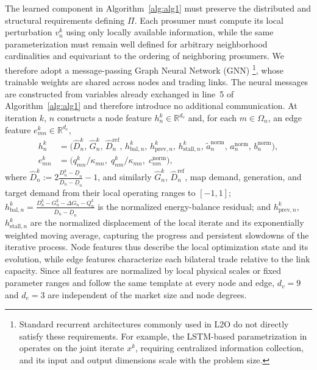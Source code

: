 \documentclass[final]{l4dc2026}
\begin{document}
The learned component in Algorithm~\ref{alg:alg1} must preserve the distributed and structural requirements defining $\Pi$. Each prosumer must compute its local perturbation $v_n^k$ using only locally available information, while the same parameterization must remain well defined for arbitrary neighborhood cardinalities and equivariant to the ordering of neighboring prosumers.
We therefore adopt a message-passing Graph Neural Network (GNN)
\footnote{Standard recurrent architectures commonly used in L2O do not directly satisfy these requirements. For example, the LSTM-based parametrization in~\citep{martin_learning_2026} operates on the joint iterate $x^k$, requiring centralized information collection, and its input and output dimensions scale with the problem size.}\citep{qian2024exploring}, whose trainable weights are shared across nodes and trading links.
The neural messages are constructed from variables already exchanged in line~5 of Algorithm~\ref{alg:alg1} and therefore introduce no additional communication.
At iteration $k$, $n$ constructs a node feature $h_n^k\in\mathbb{R}^{d_v}$ and, for each $m\in\Omega_n$, an edge feature $e_{mn}^k\in\mathbb{R}^{d_e}$,
\begin{equation}
\begin{aligned}
  h_n^k &= \big(\hat D_n^k,\, \hat G_n^k,\, \hat D_n^{\text{ref}},\,
  h_{\mathrm{bal},n}^k,\, h_{\mathrm{prev},n}^k,\, h_{\mathrm{stall},n}^k,\,
  \tilde a_n^{\text{norm}},\, a_n^{\text{norm}},\, b_n^{\text{norm}}\big),\\
  e_{mn}^k &= \big(q_{mn}^k/\kappa_{mn},\; q_{nm}^k/\kappa_{mn},\; c_{nm}^{\text{norm}}\big),
\end{aligned}
\label{eq:features}
\end{equation}
where $\hat D_n^k := 2\frac{D_n^k-\underline D_n}{\overline D_n-\underline D_n}-1$, and similarly $\hat G_n^k$, $\hat D_n^{\text{ref}}$, map demand, generation, and target demand from their local operating ranges to $[-1,1]$; $h_{\mathrm{bal},n}^k = \frac{D_n^k-G_n^k-\Delta G_n-Q_n^k}{\overline D_n-\underline D_n}$ is the normalized energy-balance residual; and $h_{\mathrm{prev},n}^k$, $h_{\mathrm{stall},n}^k$ are the normalized displacement of the local iterate and its exponentially weighted moving average, capturing the progress and persistent slowdowns of the iterative process. Node features thus describe the local optimization state and its evolution, while edge features characterize each bilateral trade relative to the link capacity. Since all features are normalized by local physical scales or fixed parameter ranges and follow the same template at every node and edge, $d_v=9$ and $d_e=3$ are independent of the market size and node degrees.
\end{document}
